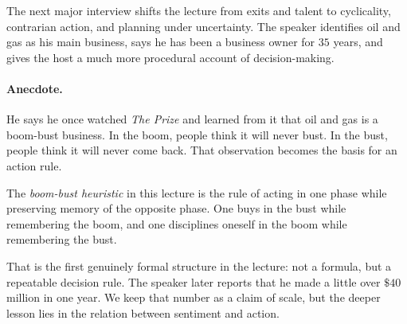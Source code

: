 The next major interview shifts the lecture from exits and talent to cyclicality, contrarian action, and planning under uncertainty. The speaker identifies oil and gas as his main business, says he has been a business owner for \(35\) years, and gives the host a much more procedural account of decision-making.

\paragraph{Anecdote.} He says he once watched \emph{The Prize} and learned from it that oil and gas is a boom-bust business. In the boom, people think it will never bust. In the bust, people think it will never come back. That observation becomes the basis for an action rule.

\begin{definition}
The \emph{boom-bust heuristic} in this lecture is the rule of acting in one phase while preserving memory of the opposite phase. One buys in the bust while remembering the boom, and one disciplines oneself in the boom while remembering the bust.
\end{definition}

\begin{figure}
\begin{center}
\end{center}
\end{figure}

That is the first genuinely formal structure in the lecture: not a formula, but a repeatable decision rule. The speaker later reports that he made a little over \(\$40\) million in one year. We keep that number as a claim of scale, but the deeper lesson lies in the relation between sentiment and action.

